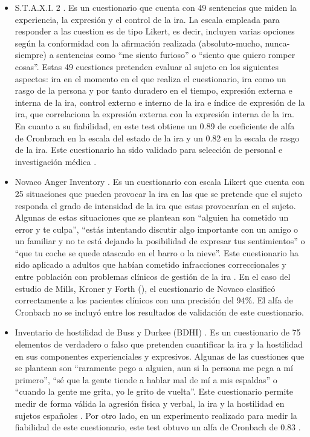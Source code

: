 \begin{itemize}
    \item S.T.A.X.I. 2 \citep{spielberger}. Es un cuestionario que cuenta con 49 sentencias que miden la experiencia, la expresión y el control de la ira. La escala empleada para responder a las cuestion es de tipo Likert, es decir, incluyen varias opciones según la conformidad con la afirmación realizada (absoluto-mucho, nunca-siempre) a sentencias como ``me siento furioso'' o ``siento que quiero romper cosas''. Estas 49 cuestiones pretenden evaluar al sujeto en los siguientes aspectos: ira en el momento en el que realiza el cuestionario, ira como un rasgo de la persona y por tanto duradero en el tiempo, expresión externa e interna de la ira, control externo e interno de la ira e índice de expresión de la ira, que correlaciona la expresión externa con la expresión interna de la ira. En cuanto a su fiabilidad, en este test obtiene un 0.89 de coeficiente de alfa de Cronbrach en la escala del estado de la ira y un 0.82 en la escala de rasgo de la ira. Este cuestionario ha sido validado para selección de personal e investigación médica \citep{de1997anger, turnage1991job}.

    \item Novaco Anger Inventory \citep{novaco2003novaco}. Es un cuestionario con escala Likert que cuenta con 25 situaciones que pueden provocar la ira en las que se pretende que el sujeto responda el grado de intensidad de la ira que estas provocarían en el sujeto. Algunas de estas situaciones que se plantean son ``alguien ha cometido un error y te culpa'', ``estás intentando discutir algo importante con un amigo o un familiar y no te está dejando la posibilidad de expresar tus sentimientos'' o ``que tu coche se quede atascado en el barro o la nieve''. Este cuestionario ha sido aplicado a adultos que habían cometido infracciones correccionales y entre población con problemas clínicos de gestión de la ira \citep{mills1998novaco, jones1999normative}. En el caso del estudio de Mills, Kroner y Forth (\citeyear{jones1999normative}), el cuestionario de Novaco clasificó correctamente a los pacientes clínicos con una precisión del 94\%. El alfa de Cronbach no se incluyó entre los resultados de validación de este cuestionario.

    \item Inventario de hostilidad de Buss y Durkee (BDHI) \citep{buss1957inventory}. Es un cuestionario de 75 elementos de verdadero o falso que pretenden cuantificar la ira y la hostilidad en sus componentes experienciales y expresivos. Algunas de las cuestiones que se plantean son ``raramente pego a alguien, aun si la persona me pega a mí primero'', ``sé que la gente tiende a hablar mal de mí a mis espaldas'' o ``cuando la gente me grita, yo le grito de vuelta''. Este cuestionario permite medir de forma válida la agresión física y verbal, la ira y la hostilidad en sujetos españoles \citep{lopezvalidacion}. Por otro lado, en un experimento realizado para medir la fiabilidad de este cuestionario, este test obtuvo un alfa de Cronbach de 0.83 \citep{grana2001tipologia}.


\end{itemize}
